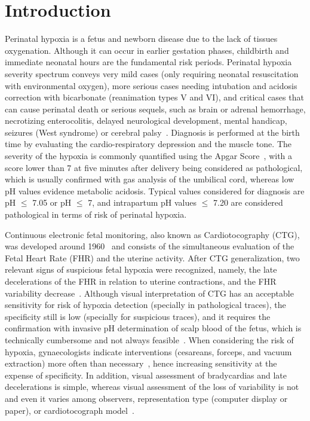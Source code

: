 \section{Introduction}

Perinatal hypoxia is a  fetus and newborn disease due to  the lack of tissues oxygenation. Although it can occur in earlier gestation phases, childbirth and immediate neonatal hours are the fundamental risk periods.
Perinatal hypoxia severity spectrum conveys very mild cases (only requiring neonatal resuscitation with environmental oxygen), more serious cases needing intubation and  acidosis correction with bicarbonate (reanimation types V and VI), and critical cases that can cause perinatal death or serious sequels, such as brain or adrenal hemorrhage, necrotizing enterocolitis, delayed neurological development, mental handicap, seizures (West syndrome) or cerebral palsy~\cite{Leuthner2004,Morales2011}. Diagnosis is performed at the birth time by evaluating the cardio-respiratory depression and the muscle tone. The severity of the hypoxia is commonly quantified using the Apgar Score~\cite{Apgar1953,casey2001continuing}, with a score lower than 7 at five minutes after delivery being considered as pathological, which is  usually confirmed with gas analysis of the umbilical cord, whereas low pH values  evidence  metabolic acidosis. Typical values considered for diagnosis are pH $\leq$ 7.05 or pH $\leq$ 7, and intrapartum pH values $\leq$  7.20  are considered pathological in terms of risk of perinatal hypoxia.


Continuous electronic fetal monitoring, also known as Cardiotocography (CTG), was developed around 1960~\cite{Hon1958,Hammacher1968} and consists of the simultaneous evaluation of the Fetal Heart Rate (FHR) and the uterine activity. 
After CTG generalization, two relevant signs of suspicious fetal hypoxia were recognized, namely, the late decelerations of the FHR in relation to uterine contractions, and the FHR variability decrease~\cite{Low1999}. 
Although visual interpretation of CTG has an acceptable sensitivity for  risk of hypoxia detection (specially in pathological traces), the specificity still is low (specially for suspicious traces), and it requires the confirmation with invasive pH determination of scalp blood of the fetus, which is technically cumbersome and not always feasible~\cite{Tasnim2009}. When considering the risk of hypoxia, gynaecologists indicate interventions (cesareans, forceps, and vacuum extraction) more often than necessary~\cite{Tasnim2009}, hence increasing sensitivity at the expense of specificity. In addition, visual assessment of bradycardias and late decelerations is simple, whereas visual assessment of the loss of variability is not and even it varies among observers, representation type (computer display or paper), or cardiotocograph model~\cite{Ayres-de-Campos1999,Bernardes1997,Santo2012}.

